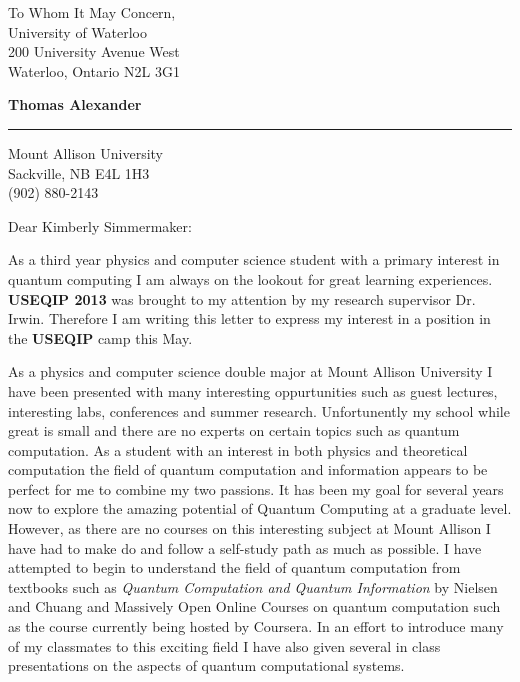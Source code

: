 \documentclass{letter} %
\begin{document}
\signature{Thomas Alexander}           %
\longindentation=0pt                       %
\let\raggedleft\raggedright                %
 
 
\begin{letter}{To Whom It May Concern, \\

 University of Waterloo\\
 200 University Avenue West \\
 Waterloo, Ontario  N2L 3G1}

\begin{center}
{\large\bf Thomas Alexander} 
\end{center}
\medskip\hrule height 1pt
\begin{center}
{Mount Allison University \\   Sackville, NB E4L 1H3 \\ (902) 880-2143} 
\end{center} \vfill %
 
 
\opening{Dear Kimberly Simmermaker:} 
 
\noindent As a third year physics and computer science student with a primary interest in
quantum computing I am always on the lookout for great learning experiences. \textbf {USEQIP 2013} was brought to my attention by my research supervisor Dr. Irwin. Therefore I am writing this letter to express my interest in a position in the \textbf{USEQIP} camp this May.
 
\noindent As a physics and computer science double major at Mount Allison University I have been presented with many interesting oppurtunities such as guest lectures, interesting labs, conferences and summer research. Unfortunently my school while great is small and there are no experts on certain topics such as quantum computation. As a student with an interest in both physics and theoretical computation the field of quantum computation and information appears to be perfect for me to combine my two passions. It has been my goal for several years now to explore the amazing potential of Quantum Computing at a graduate level. However, as there are no courses on this interesting subject at Mount Allison I have had to make do and follow a self-study path as much as possible. I have attempted to begin to understand the field of quantum computation from textbooks such as \emph{Quantum Computation and Quantum Information} by Nielsen and Chuang and Massively Open Online Courses on quantum computation such as the course currently being hosted by Coursera. In an effort to introduce many of my classmates to this exciting field I have also given several in class presentations on the aspects of quantum computational systems. 


\end{letter}
\end{document}
